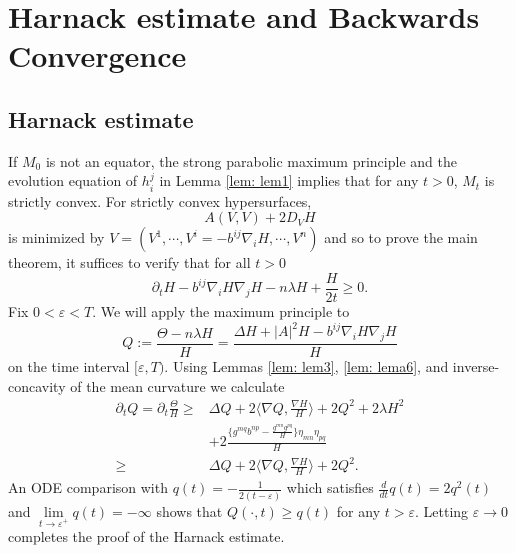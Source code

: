 \documentclass{amsart}
\newtheorem{theorem}{Theorem}
\theoremstyle{definition}
\theoremstyle{remark}
\numberwithin{equation}{section}
\begin{document}
\section{Harnack estimate and Backwards Convergence}
\subsection{Harnack estimate}
If $M_0$ is not an equator, the strong parabolic maximum principle and the evolution equation of $h_i^j$ in Lemma \ref{lem: lem1} implies that for any $t>0$, $M_t$ is strictly convex. For strictly convex hypersurfaces, $$A(V,V)+2D_VH$$ is minimized by $V=(V^1,\cdots,V^i=-b^{ij}\nabla_iH,\cdots,V^n)$ and so to prove the main theorem, it suffices to verify that for all $t>0$
\[\partial_tH-b^{ij}\nabla_iH\nabla_jH-n\lambda H +\frac{H}{2t}\geq 0.\]
Fix $0<\varepsilon<T.$ We will apply the maximum principle to
$$Q:=\frac{\Theta-n\lambda H}{H}=\frac{\Delta H+|A|^2H-b^{ij}\nabla_iH\nabla_jH}{H}$$
on the time interval $[\varepsilon, T).$ Using Lemmas \ref{lem: lem3}, \ref{lem: lema6}, and inverse-concavity of the mean curvature we calculate
\begin{align*}
\partial_tQ=\partial_t \frac{\Theta}{H}\geq&\Delta Q+2\langle \nabla Q,\frac{\nabla H}{H}\rangle+ 2Q^2+2\lambda H^2\\
&+2\frac{\{g^{mq}b^{np}-\frac{g^{mn}g^{pq}}{H}\}\eta_{mn}\eta_{pq}}{H}\\
\geq& \Delta Q+2\langle \nabla Q,\frac{\nabla H}{H}\rangle+ 2Q^2.
\end{align*}
An ODE comparison with $q(t)=-\frac{1}{2(t-\varepsilon)}$ which satisfies $\frac{d}{dt}q(t)=2q^2(t)$ and $\lim\limits_{t\to \varepsilon^+}q(t)=-\infty$ shows that $Q(\cdot,t)\geq q(t)$ for any $t>\varepsilon.$ Letting $\varepsilon\to 0$ completes the proof of the Harnack estimate.
\end{document}
